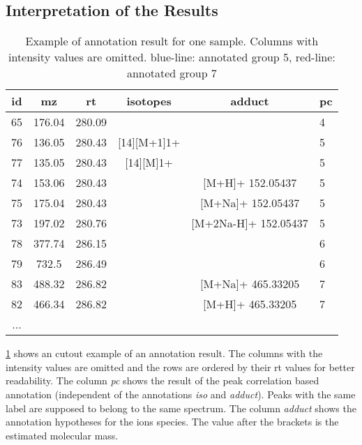 \documentclass[a4paper,12pt]{article}
\begin{document}
\subsection{Interpretation of the Results}
\label{CAMERAresults}
\begin{table}[ht]
\begin{center}
\begin{tabular}{|c|cc|c|c|l|}\hline
 id & mz & rt & isotopes & adduct & pc \\
\hline
             65 & 176.04 & 280.09 &     &           &  4\\
\rowcolor{blue!20}   76 & 136.05 & 280.43 &[14][M+1]1+  &           & 5\\
\rowcolor{blue!20}   77 & 135.05 & 280.43 &[14][M]1+    &           & 5\\
\rowcolor{blue!20}   74 & 153.06 & 280.43 &         &[M+H]+ 152.05437   & 5\\
\rowcolor{blue!20}   75 & 175.04 & 280.43 &         &[M+Na]+ 152.05437  & 5\\
\rowcolor{blue!20}   73 & 197.02 & 280.76 &         &[M+2Na-H]+ 152.05437   &
5\\
             78 & 377.74 & 286.15 &     &           &  6\\
             79 & 732.5  & 286.49 &     &           &  6\\
\rowcolor{red!20}    83 & 488.32 & 286.82 &     &[M+Na]+ 465.33205  & 7\\
\rowcolor{red!20}    82 & 466.34 & 286.82 &     &[M+H]+ 465.33205   & 7\\
...&&&&&\\
\hline
\end{tabular}
\end{center}
     \caption{{\footnotesize{Example of annotation result for one sample. Columns
with intensity values are omitted. blue-line: annotated group 5, red-line:
annotated group 7}}} \label{tab:int}
\end{table}


\ref{tab:int} shows an cutout example of an annotation result. The columns with the
intensity values are omitted and the rows are ordered by their rt values
 for better readability. The column \textit{pc} shows the result of the peak
correlation based
annotation (independent of the annotations \textit{iso} and
\textit{adduct}). Peaks with the same label are supposed to belong to
the same spectrum. The column \textit{adduct} shows the annotation hypotheses
for the ions species. The value after the brackets
is the estimated molecular mass.
\end{document}
